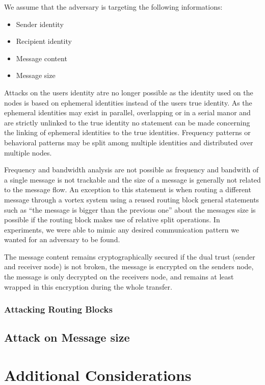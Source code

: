We assume that the adversary is targeting the following informations:
\begin{itemize}
	\item Sender identity
	\item Recipient identity
	\item Message content
	\item Message size
\end{itemize}

Attacks on the users identity atre no longer possible as the identity used on the nodes is based on ephemeral identities instead of the users true identity. As the ephemeral identities may exist in parallel, overlapping or in a serial manor and are strictly unlinked to the true identity no statement can be made concerning the linking of ephemeral identities to the true identities. Frequency patterns or behavioral patterns may be split among multiple identities and distributed over multiple nodes. 

Frequency and bandwidth analysis are not possible as frequency and bandwith of a single message is not trackable and the size of a message is generally not related to the message flow. An exception to this statement is when routing a different message through a vortex system using a reused routing block general statements such as ``the message is bigger than the previous one'' about the messages size is possible if the routing block makes use of relative split operations. In experiments, we were able to mimic any desired communication pattern we wanted for an adversary to be found.

The message content remains cryptographically secured if the dual trust (sender and receiver node) is not broken, the message is encrypted on the senders node, the message is only decrypted on the receivers node, and remains at least wrapped in this encryption during the whole transfer. 

\subsection{Attacking Routing Blocks}

\section{Attack on Message size}


\chapter{Additional Considerations}
